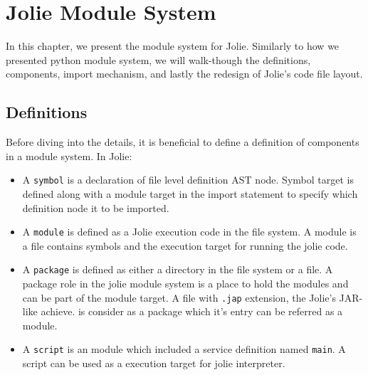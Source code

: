 \chapter{Jolie Module System}

In this chapter, we present the module system for Jolie.
Similarly to how we presented python module system, we will walk-though the definitions, components, import mechanism, and lastly the redesign of Jolie's code file layout.

\section{Definitions}

Before diving into the details, it is beneficial to define a definition of components in a module system. In Jolie:

\begin{itemize}
      \item
            A \texttt{symbol} is a declaration of file level definition AST node. Symbol target is defined along with a module target in the import statement to specify which definition node it to be imported.
      \item
            A \texttt{module} is defined as a Jolie execution code in the file system. A module is a file contains symbols and the execution target for running the jolie code.
      \item
            A \texttt{package} is defined as either a directory in the file system or a file. A package role in the jolie module system is a place to hold the modules and can be part of the module target. A file with \texttt{.jap} extension, the Jolie's JAR-like achieve. is consider as a package which it's entry can be referred as a module.
      \item
            A \texttt{script} is an module which included a service definition named \texttt{main}. A script can be used as a execution target for jolie interpreter. 
\end{itemize}











